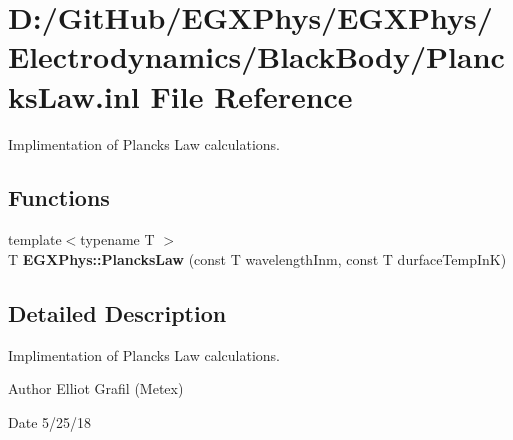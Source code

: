 \hypertarget{_plancks_law_8inl}{}\section{D\+:/\+Git\+Hub/\+E\+G\+X\+Phys/\+E\+G\+X\+Phys/\+Electrodynamics/\+Black\+Body/\+Plancks\+Law.inl File Reference}
\label{_plancks_law_8inl}


Implimentation of Planck\textquotesingle{}s Law calculations.  


\subsection*{Functions}
\begin{DoxyCompactItemize}
\item 
\mbox{\label{_plancks_law_8inl_ae9c265cb21a761aa313dcdd17f1d1560}} 
{\footnotesize template$<$typename T $>$ }\\T {\bfseries E\+G\+X\+Phys\+::\+Plancks\+Law} (const T wavelength\+Inm, const T durface\+Temp\+InK)
\end{DoxyCompactItemize}


\subsection{Detailed Description}
Implimentation of Planck\textquotesingle{}s Law calculations. 

\begin{DoxyAuthor}{Author}
Elliot Grafil (Metex) 
\end{DoxyAuthor}
\begin{DoxyDate}{Date}
5/25/18 
\end{DoxyDate}
